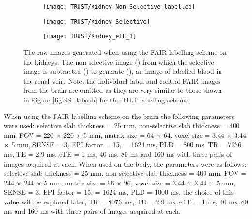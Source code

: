 \begin{figure}[H]
	\centering
	\begin{subfigure}[c]{0.30\textwidth}
		\centering
		\texttt{[image: TRUST/Kidney\_Non\_Selective\_labelled]}
		\caption{}
		\label{fig:RV_nonsel}
	\end{subfigure}
	\hfill
	\begin{subfigure}[c]{0.30\textwidth}
		\centering
		\texttt{[image: TRUST/Kidney\_Selective]}
		\caption{}
		\label{fig:RV_sel}
	\end{subfigure}
	\hfill
	\begin{subfigure}[c]{0.30\textwidth}
		\centering
		\texttt{[image: TRUST/Kidney\_eTE\_1]}
		\caption{}
		\label{fig:RV_diff}
	\end{subfigure}
	\caption{The raw images generated when using the \ac{FAIR} labelling scheme on the kidneys. The non-selective image () from which the selective image is subtracted () to generate (), an image of labelled blood in the renal vein. Note, the individual label and control \ac{FAIR} images from the brain are omitted as they are very similar to those shown in Figure \ref{fig:SS_labsub} for the \ac{TILT} labelling scheme.}
	\label{fig:RV_labsub}
\end{figure}

When using the \ac{FAIR} labelling scheme on the brain the following parameters were used: selective slab thickness = 25 mm, non-selective slab thickness = 400 mm, \ac{FOV} = 220 $\times$ 220 $\times$ 5 mm, matrix size = 64 $\times$ 64, voxel size = 3.44 $\times$ 3.44 $\times$ 5 mm, \ac{SENSE} = 3, \ac{EPI} factor = 15, \tone = 1624 ms, \ac{PLD} = 800 ms, \ac{TR} = 7276 ms, \ac{TE} = 2.9 ms, \ac{eTE} = 1 ms, 40 ms, 80 ms and 160 ms with three pairs of images acquired at each. When used on the body, the parameters were as follows: selective slab thickness = 25 mm, non-selective slab thickness = 400 mm, \ac{FOV} = 244 $\times$ 244 $\times$ 5 mm, matrix size = 96 $\times$ 96, voxel size = 3.44 $\times$ 3.44 $\times$ 5 mm, \ac{SENSE} = 3, \ac{EPI} factor = 15, \tone = 1624 ms, \ac{PLD} = 1000 ms, the choice of this value will be explored later, \ac{TR} = 8076 ms, \ac{TE} = 2.9 ms, \ac{eTE} = 1 ms, 40 ms, 80 ms and 160 ms with three pairs of images acquired at each.

\newpage
